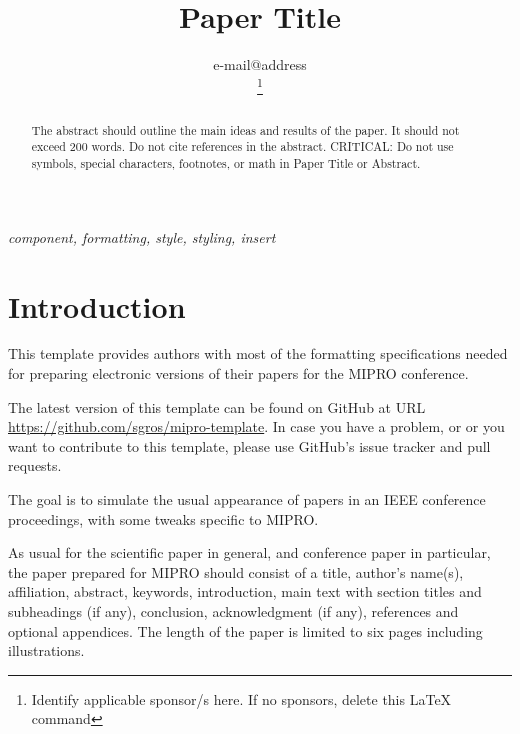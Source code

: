 \documentclass{MIPRO}
\begin{document}
\title{Paper Title}

\author{



e-mail@address

\thanks{Identify applicable sponsor/s here. If no sponsors, delete this \LaTeX{} command}
}

\maketitle

\begin{abstract}
The abstract should outline the main ideas and results of the paper. It should not exceed 200 words. Do not cite references in the abstract. CRITICAL: Do not use symbols, special characters, footnotes, or math in Paper Title or Abstract.
\end{abstract}

\renewcommand\IEEEkeywordsname{Keywords}
\begin{IEEEkeywords}
\textit{component, formatting, style, styling, insert}
\end{IEEEkeywords}

\section{Introduction}

This template provides authors with most of the formatting specifications needed for preparing electronic versions of their papers for the MIPRO conference.

The latest version of this template can be found on GitHub at URL \url{https://github.com/sgros/mipro-template}. In case you have a problem, or or you want to contribute to this template, please use GitHub's issue tracker and pull requests.

The goal is to simulate the usual appearance of papers in an IEEE conference proceedings, with some tweaks specific to MIPRO.

As usual for the scientific paper in general, and conference paper in particular, the paper prepared for MIPRO should consist of a title, author's name(s), affiliation, abstract, keywords, introduction, main text with section titles and subheadings (if any), conclusion, acknowledgment (if any), references and optional appendices. The length of the paper is limited to six pages including illustrations.
\end{document}
